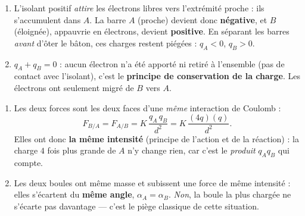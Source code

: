 \documentclass[11pt,a4paper]{article}
\begin{document}
\begin{corrige}
\begin{enumerate}[label=\alph*)]
  \item L'isolant positif \emph{attire} les électrons libres vers l'extrémité proche : ils
        s'accumulent dans $A$. La barre $A$ (proche) devient donc \textbf{négative}, et $B$
        (éloignée), appauvrie en électrons, devient \textbf{positive}. En séparant les barres
        \emph{avant} d'ôter le bâton, ces charges restent piégées : $q_A<0$, $q_B>0$.
  \item $q_A + q_B = 0$ : aucun électron n'a été apporté ni retiré à l'ensemble (pas de contact
        avec l'isolant), c'est le \textbf{principe de conservation de la charge}. Les électrons ont
        seulement migré de $B$ vers $A$.
\end{enumerate}
\end{corrige}

\begin{corrige}
\begin{enumerate}[label=\alph*)]
  \item Les deux forces sont les deux faces d'une \emph{même} interaction de Coulomb :
        \[ F_{B/A} = F_{A/B} = K\,\frac{q_A\,q_B}{d^2} = K\,\frac{(4q)(q)}{d^2}. \]
        Elles ont donc \textbf{la même intensité} (principe de l'action et de la réaction) : la
        charge $4$ fois plus grande de $A$ n'y change rien, car c'est le \emph{produit} $q_A q_B$
        qui compte.
  \item Les deux boules ont même masse et subissent une force de même intensité : elles s'écartent
        du \textbf{même angle}, $\alpha_A = \alpha_B$. \emph{Non}, la boule la plus chargée ne
        s'écarte pas davantage — c'est le piège classique de cette situation.
\end{enumerate}
\end{corrige}
\end{document}
